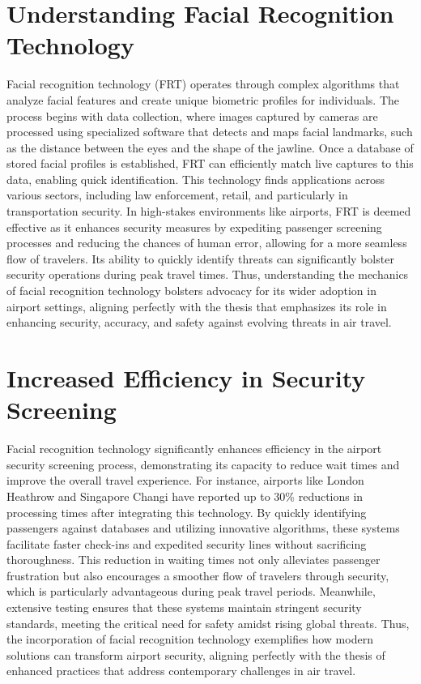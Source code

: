 \documentclass{article}%
\begin{document}
\section*{Understanding Facial Recognition Technology}%
\label{sec:UnderstandingFacialRecognitionTechnology}%
Facial recognition technology (FRT) operates through complex algorithms that analyze facial features and create unique biometric profiles for individuals. The process begins with data collection, where images captured by cameras are processed using specialized software that detects and maps facial landmarks, such as the distance between the eyes and the shape of the jawline. Once a database of stored facial profiles is established, FRT can efficiently match live captures to this data, enabling quick identification. This technology finds applications across various sectors, including law enforcement, retail, and particularly in transportation security. In high{-}stakes environments like airports, FRT is deemed effective as it enhances security measures by expediting passenger screening processes and reducing the chances of human error, allowing for a more seamless flow of travelers. Its ability to quickly identify threats can significantly bolster security operations during peak travel times. Thus, understanding the mechanics of facial recognition technology bolsters advocacy for its wider adoption in airport settings, aligning perfectly with the thesis that emphasizes its role in enhancing security, accuracy, and safety against evolving threats in air travel.

%
\section*{Increased Efficiency in Security Screening}%
\label{sec:IncreasedEfficiencyinSecurityScreening}%
Facial recognition technology significantly enhances efficiency in the airport security screening process, demonstrating its capacity to reduce wait times and improve the overall travel experience. For instance, airports like London Heathrow and Singapore Changi have reported up to 30\% reductions in processing times after integrating this technology. By quickly identifying passengers against databases and utilizing innovative algorithms, these systems facilitate faster check{-}ins and expedited security lines without sacrificing thoroughness. This reduction in waiting times not only alleviates passenger frustration but also encourages a smoother flow of travelers through security, which is particularly advantageous during peak travel periods. Meanwhile, extensive testing ensures that these systems maintain stringent security standards, meeting the critical need for safety amidst rising global threats. Thus, the incorporation of facial recognition technology exemplifies how modern solutions can transform airport security, aligning perfectly with the thesis of enhanced practices that address contemporary challenges in air travel.
\end{document}
